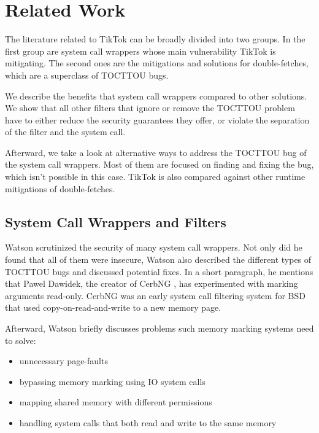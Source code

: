 \section{Related Work}
\label{sec:relatedwork}

The literature related to TikTok can be broadly divided into two groups. In the
first group are system call wrappers whose main vulnerability TikTok is
mitigating. The second ones are the mitigations and solutions for
double-fetches, which are a superclass of TOCTTOU bugs.

We describe the benefits that system call wrappers compared to other solutions.
We show that all other filters that ignore or remove the TOCTTOU problem have
to either reduce the security guarantees they offer, or violate the separation
of the filter and the system call.

Afterward, we take a look at alternative ways to address the TOCTTOU bug of the
system call wrappers. Most of them are focused on finding and fixing the bug,
which isn't possible in this case. TikTok is also compared against other runtime
mitigations of double-fetches.

\subsection{System Call Wrappers and Filters}

Watson \cite{watson2007exploiting} scrutinized the security of many system call
wrappers. Not only did he found that all of them were insecure, Watson also
described the different types of TOCTTOU bugs and discussed potential fixes. In
a short paragraph, he mentions that Pawel Dawidek, the creator of CerbNG
\cite{zak_frasunek_dawidek}, has experimented with marking arguments read-only.
CerbNG was an early system call filtering system for BSD that used
copy-on-read-and-write to a new memory page.

Afterward, Watson briefly discusses problems such memory marking systems
need to solve: 
\begin{itemize}
    \item unnecessary page-faults
    \item bypassing memory marking using IO system calls
    \item mapping shared memory with different permissions
    \item handling system calls that both read and write to the same memory
\end{itemize}

